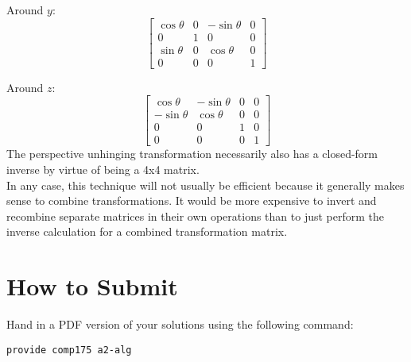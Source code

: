 \documentclass[10pt,twocolumn]{article}
\begin{document}
Around $y$:
\[ \begin{bmatrix}
\cos{\theta} & 0 & -\sin{\theta} & 0 \\
0 & 1 & 0 & 0 \\
\sin{\theta} & 0 & \cos{\theta} & 0 \\
0 & 0 & 0 & 1 
\end{bmatrix} \]

Around $z$:
\[ \begin{bmatrix}
\cos{\theta} &-\sin{\theta} & 0 & 0 \\
-\sin{\theta} & \cos{\theta} & 0 & 0 \\
0 & 0 & 1 & 0 \\
0 & 0 & 0 & 1 
\end{bmatrix} \]
The perspective unhinging transformation necessarily also has a closed-form inverse by virtue of being a 4x4 matrix. \\[5mm]
In any case, this technique will not usually be efficient because it generally makes sense to combine transformations. It would be more expensive to invert and recombine separate matrices in their own operations than to just perform the inverse calculation for a combined transformation matrix.
\section{How to Submit}

Hand in a PDF version of your solutions using the following command:
\begin{center}
 {\tt provide comp175 a2-alg}
 \end{center}
\end{document}
